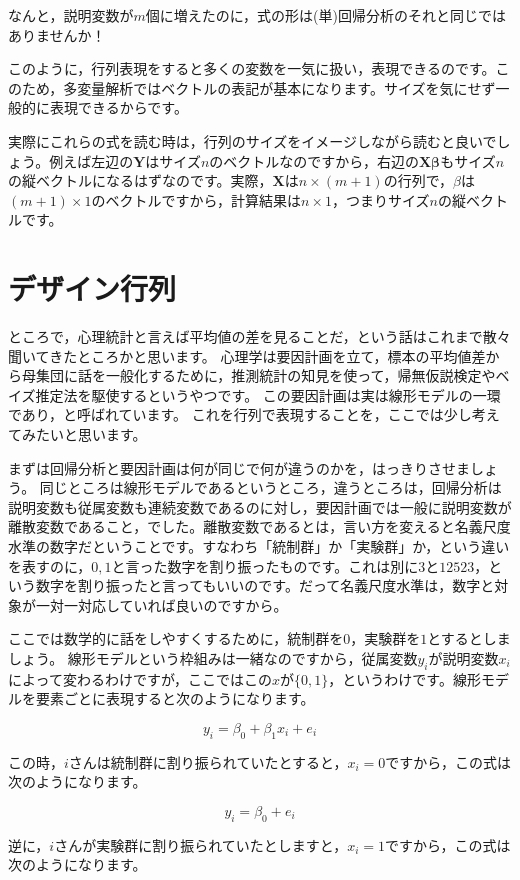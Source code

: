 \documentclass{ltjsbook}
\begin{document}
なんと，説明変数が$m$個に増えたのに，式の形は(単)回帰分析のそれと同じではありませんか！

このように，行列表現をすると多くの変数を一気に扱い，表現できるのです。このため，多変量解析ではベクトルの表記が基本になります。サイズを気にせず一般的に表現できるからです。

実際にこれらの式を読む時は，行列のサイズをイメージしながら読むと良いでしょう。例えば左辺の$\bm{Y}$はサイズ$n$のベクトルなのですから，右辺の$\bm{X \beta}$もサイズ$n$の縦ベクトルになるはずなのです。実際，$\bm{X}$は$n \times (m+1)$の行列で，$\beta$は$(m+1) \times 1$のベクトルですから，計算結果は$n \times 1$，つまりサイズ$n$の縦ベクトルです。

\section{デザイン行列}
ところで，心理統計と言えば平均値の差を見ることだ，という話はこれまで散々聞いてきたところかと思います。
心理学は要因計画を立て，標本の平均値差から母集団に話を一般化するために，推測統計の知見を使って，帰無仮説検定やベイズ推定法を駆使するというやつです。
この要因計画は実は線形モデルの一環であり，と呼ばれています。
これを行列で表現することを，ここでは少し考えてみたいと思います。

まずは回帰分析と要因計画は何が同じで何が違うのかを，はっきりさせましょう。
同じところは線形モデルであるというところ，違うところは，回帰分析は説明変数も従属変数も連続変数であるのに対し，要因計画では一般に説明変数が離散変数であること，でした。離散変数であるとは，言い方を変えると名義尺度水準の数字だということです。すなわち「統制群」か「実験群」か，という違いを表すのに，$0,1$と言った数字を割り振ったものです。これは別に$3$と$12523$，という数字を割り振ったと言ってもいいのです。だって名義尺度水準は，数字と対象が一対一対応していれば良いのですから。

ここでは数学的に話をしやすくするために，統制群を$0$，実験群を$1$とするとしましょう。
線形モデルという枠組みは一緒なのですから，従属変数$y_i$が説明変数$x_i$によって変わるわけですが，ここではこの$x$が$ \{ 0, 1 \}$，というわけです。線形モデルを要素ごとに表現すると次のようになります。

\[ y_i = \beta_0 + \beta_1 x_i + e_i \]

この時，$i$さんは統制群に割り振られていたとすると，$x_i=0$ですから，この式は次のようになります。

\[ y_i = \beta_0 + e_i \]

逆に，$i$さんが実験群に割り振られていたとしますと，$x_i= 1$ですから，この式は次のようになります。
\end{document}
